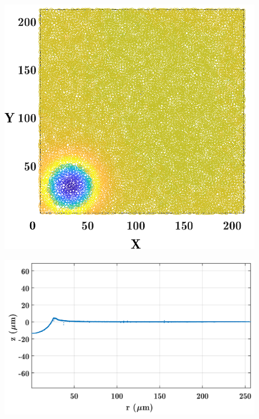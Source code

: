 \begin{figure}
	\centering
	\includegraphics[width=2\linewidth]{Chapters/Figures/sphere011_ia/particle_located_top_view}
	\caption[Partlce Located: Top View]{}
	\caption{}
	\label{fig:particlelocatedtopview}
\end{figure}
\begin{figure}
	\centering
	\includegraphics[width=\linewidth]{Chapters/Figures/sphere011_ia/side_collapsed}
	\caption[Side Collapse]{}
	\caption{}
	\label{fig:sidecollapsed}
\end{figure}
